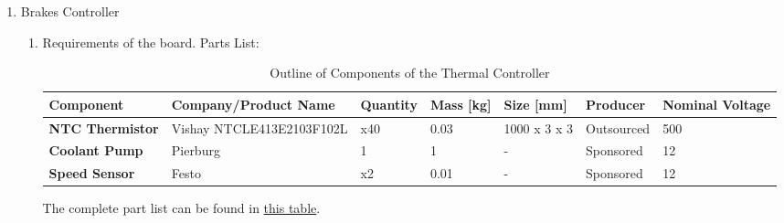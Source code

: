 \begin{enumerate}
    \item Brakes Controller
    \begin{enumerate}
        \item Requirements of the board.
        Parts List:
        \begin{table}[H]
            \centering
            \begin{adjustbox}{width=\textwidth,center}
                \begin{tabular}{|>{\bfseries}m{2cm}|m{4cm}|m{1.5cm}|m{1.5cm}|m{2cm}|m{2cm}|m{2cm}|}
                \hline
                Component & Company/Product Name & Quantity & Mass [kg] & Size [mm] & Producer & Nominal Voltage \\
                \hline
                NTC Thermistor & Vishay NTCLE413E2103F102L & x40 & 0.03 & 1000 x 3 x 3 & Outsourced & 500 \\
                \hline
                Coolant Pump & Pierburg & 1 & 1 & - & Sponsored & 12 \\
                Speed Sensor & Festo & x2 & 0.01 & - & Sponsored & 12 \\
                \hline
                \end{tabular}
            \end{adjustbox}
            \caption{Outline of Components of the Thermal Controller}
            \label{tab:thermal-ctrl-components}
        \end{table}
The complete part list can be found in \href{https://docs.google.com/spreadsheets/d/1GvvRlhKn8gMCE3rAxvrYHUjA288l9iqX/edit#gid=378650025}{this table}. \\



\end{enumerate}
\end{enumerate}
